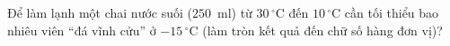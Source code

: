 	\begin{ex}%
		\label{NgheAn-ChuyenDHVinh-Lan1-III2}Để làm lạnh một chai nước suối ($250$~ml) từ $30\,^\circ\text{C}$ đến $10\,^\circ\text{C}$ cần tối thiểu bao nhiêu viên ``đá vĩnh cửu'' ở $-15\,^\circ\text{C}$ (làm tròn kết quả đến chữ số hàng đơn vị)?
		\par
	\end{ex}


